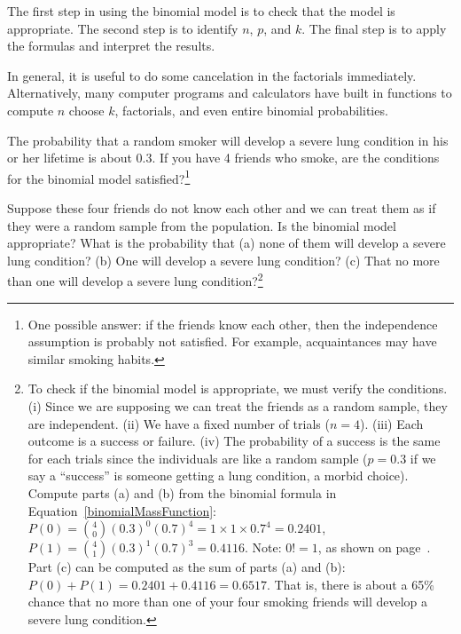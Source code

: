 \begin{tipBox}{
The first step in using the binomial model is to check that the model is appropriate. The second step is to identify $n$, $p$, and $k$. The final step is to apply the formulas and interpret the results.}
\end{tipBox}

\begin{tipBox}{
In general, it is useful to do some cancelation in the factorials immediately. Alternatively, many computer programs and calculators have built in functions to compute $n$ choose $k$, factorials, and even entire binomial probabilities.}
\end{tipBox}

\begin{exercise}
The probability that a random smoker will develop a severe lung condition in his or her lifetime is about $0.3$. If you have 4 friends who smoke, are the conditions for the binomial model satisfied?\footnote{One possible answer: if the friends know each other, then the independence assumption is probably not satisfied. For example, acquaintances may have similar smoking habits.}
\end{exercise}


\begin{exercise}
\label{noMoreThanOneFriendWSevereLungCondition}%
Suppose these four friends do not know each other and we can treat them as if they were a random sample from the population. Is the binomial model appropriate? What is the probability that (a) none of them will develop a severe lung condition? (b) One will develop a severe lung condition? (c) That no more than one will develop a severe lung condition?\footnote{To check if the binomial model is appropriate, we must verify the conditions. (i) Since we are supposing we can treat the friends as a random sample, they are independent. (ii) We have a fixed number of trials ($n=4$). (iii) Each outcome is a success or failure. (iv) The probability of a success is the same for each trials since the individuals are like a random sample ($p=0.3$ if we say a ``success'' is someone getting a lung condition, a morbid choice). Compute parts (a) and (b) from the binomial formula in Equation~\eqref{binomialMassFunction}: $P(0) =  {4 \choose 0} (0.3)^0 (0.7)^4 = 1\times1\times0.7^4 = 0.2401$, $P(1) = {4 \choose 1} (0.3)^1(0.7)^{3} = 0.4116$. Note: $0!=1$, as shown on page~\pageref{zeroFactorial}. Part (c) can be computed as the sum of parts (a) and (b): $P(0) + P(1) = 0.2401 + 0.4116 = 0.6517$. That is, there is about a 65\% chance that no more than one of your four smoking friends will develop a severe lung condition.}
\end{exercise}

